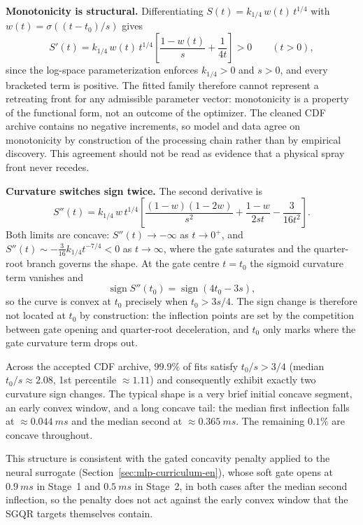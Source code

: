 \textbf{Monotonicity is structural.} Differentiating \(S(t)=k_{1/4}\,w(t)\,t^{1/4}\) with \(w(t)=\sigma((t-t_0)/s)\) gives
\[
  S'(t)=k_{1/4}\,w(t)\,t^{1/4}\left[\frac{1-w(t)}{s}+\frac{1}{4t}\right]>0
  \qquad (t>0),
\]
since the log-space parameterization enforces \(k_{1/4}>0\) and \(s>0\), and every bracketed term is positive. The fitted family therefore cannot represent a retreating front for any admissible parameter vector: monotonicity is a property of the functional form, not an outcome of the optimizer. The cleaned CDF archive contains no negative increments, so model and data agree on monotonicity by construction of the processing chain rather than by empirical discovery. This agreement should not be read as evidence that a physical spray front never recedes.

\textbf{Curvature switches sign twice.} The second derivative is
\[
  S''(t)=k_{1/4}\,w\,t^{1/4}
  \left[\frac{(1-w)(1-2w)}{s^{2}}
        +\frac{1-w}{2st}
        -\frac{3}{16t^{2}}\right].
\]
Both limits are concave: \(S''(t)\to-\infty\) as \(t\to 0^{+}\), and \(S''(t)\sim-\tfrac{3}{16}k_{1/4}t^{-7/4}<0\) as \(t\to\infty\), where the gate saturates and the quarter-root branch governs the shape. At the gate centre \(t=t_0\) the sigmoid curvature term vanishes and
\[
  \operatorname{sign}S''(t_0)=\operatorname{sign}\!\left(4t_0-3s\right),
\]
so the curve is convex at \(t_0\) precisely when \(t_0>3s/4\). The sign change is therefore not located at \(t_0\) by construction: the inflection points are set by the competition between gate opening and quarter-root deceleration, and \(t_0\) only marks where the gate curvature term drops out.

Across the accepted CDF archive, \(99.9\%\) of fits satisfy \(t_0/s>3/4\) (median \(t_0/s\approx2.08\), 1st percentile \(\approx1.11\)) and consequently exhibit exactly two curvature sign changes. The typical shape is a very brief initial concave segment, an early convex window, and a long concave tail: the median first inflection falls at \(\approx\SI{0.044}{ms}\) and the median second at \(\approx\SI{0.365}{ms}\). The remaining \(0.1\%\) are concave throughout.

This structure is consistent with the gated concavity penalty applied to the neural surrogate (Section~\ref{sec:mlp-curriculum-en}), whose soft gate opens at \(\SI{0.9}{ms}\) in Stage~1 and \(\SI{0.5}{ms}\) in Stage~2, in both cases after the median second inflection, so the penalty does not act against the early convex window that the SGQR targets themselves contain.

